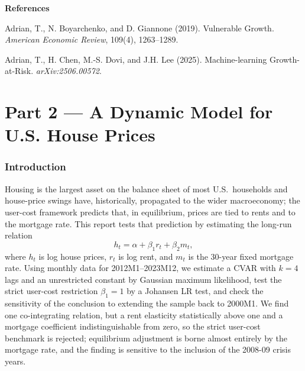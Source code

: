 \documentclass[12pt]{article}
\begin{document}
\bigskip
\noindent\textbf{References}

\noindent Adrian, T., N. Boyarchenko, and D. Giannone (2019). Vulnerable Growth. \textit{American Economic Review}, 109(4), 1263--1289.

\noindent Adrian, T., H. Chen, M.-S. Dovi, and J.H. Lee (2025). Machine-learning Growth-at-Risk. \textit{arXiv:2506.00572}.


\newpage
\part{Part 2 --- A Dynamic Model for U.S. House Prices}
\setcounter{section}{0}
\setcounter{figure}{0}
\setcounter{table}{0}
\setcounter{equation}{0}
\renewcommand{\thefigure}{2.\arabic{figure}}
\renewcommand{\thetable}{2.\arabic{table}}
\renewcommand{\theequation}{2.\arabic{equation}}

\section{Introduction}\label{sec:p2-intro}

Housing is the largest asset on the balance sheet of most U.S.\ households and house-price swings have, historically, propagated to the wider macro\-economy; the user-cost framework predicts that, in equilibrium, prices are tied to rents and to the mortgage rate. This report tests that prediction by estimating the long-run relation
\begin{equation}
    h_t = \alpha + \beta_1 r_t + \beta_2 m_t,
\end{equation}
where $h_t$ is log house prices, $r_t$ is log rent, and $m_t$ is the 30-year fixed mortgage rate. Using monthly data for 2012M1--2023M12, we estimate a CVAR with $k=4$ lags and an unrestricted constant by Gaussian maximum likelihood, test the strict user-cost restriction $\beta_1=1$ by a Johansen LR test, and check the sensitivity of the conclusion to extending the sample back to 2000M1.
\newline
\newline
We find one co-integrating relation, but a rent elasticity statistically above one and a mortgage coefficient indistinguishable from zero, so the strict user-cost benchmark is rejected; equilibrium adjustment is borne almost entirely by the mortgage rate, and the finding is sensitive to the inclusion of the 2008-09 crisis years.
\end{document}
